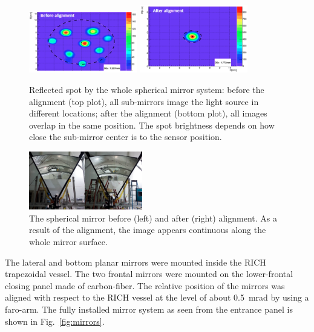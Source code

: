 \documentclass[5p,times,twocolumn]{elsarticle}
\begin{document}
\begin{figure}
\begin{center}
\includegraphics[width=0.42\textwidth]{mirror_spot1.png}
\includegraphics[width=0.42\textwidth]{mirror_spot2.png}
\caption{Reflected spot by the whole spherical mirror system: before the alignment (top plot), all sub-mirrors
  image the light source in different locations; after the alignment (bottom plot), all images overlap in the same
  position. The spot brightness depends on how close the sub-mirror center is to the sensor position.}
\label{fig:MirSpots}
\end{center}
\end{figure}

\begin{figure}
\begin{center}
\includegraphics[width=0.44\textwidth]{mirror_sphere.png}
\caption{The spherical mirror before (left) and after (right) alignment. As a result of the alignment, the image
  appears continuous along the whole mirror surface.}
\label{fig:MirAlign}
\end{center}
\end{figure}

The lateral and bottom planar mirrors were mounted inside the RICH trapezoidal vessel. The two frontal mirrors
were mounted on the lower-frontal closing panel made of carbon-fiber. The relative position of the mirrors was
aligned with respect to the RICH vessel at the level of about 0.5~mrad by using a faro-arm. The fully installed
mirror system as seen from the entrance panel is shown in Fig.~\ref{fig:mirrors}.
\end{document}
